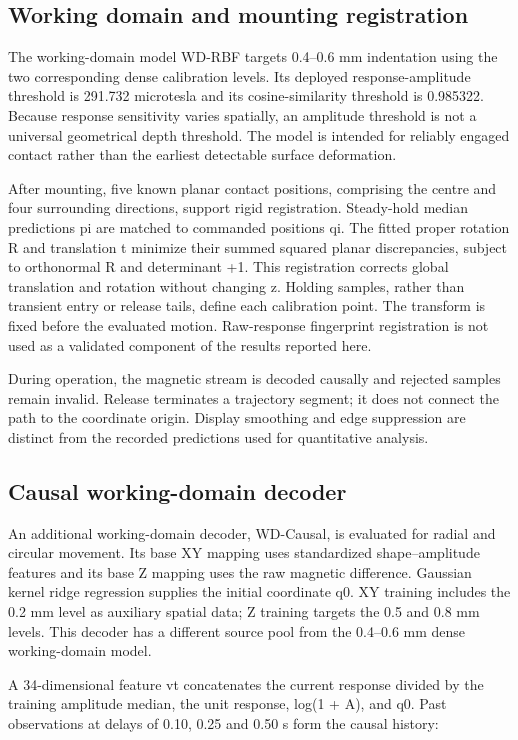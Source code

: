 \documentclass[preprint,12pt]{elsarticle}
\begin{document}
\subsection{Working domain and mounting registration}

The working-domain model WD-RBF targets 0.4--0.6 mm indentation using the two corresponding dense calibration levels. Its deployed response-amplitude threshold is 291.732 microtesla and its cosine-similarity threshold is 0.985322. Because response sensitivity varies spatially, an amplitude threshold is not a universal geometrical depth threshold. The model is intended for reliably engaged contact rather than the earliest detectable surface deformation.

After mounting, five known planar contact positions, comprising the centre and four surrounding directions, support rigid registration. Steady-hold median predictions pi are matched to commanded positions qi. The fitted proper rotation R and translation t minimize their summed squared planar discrepancies, subject to orthonormal R and determinant +1. This registration corrects global translation and rotation without changing z. Holding samples, rather than transient entry or release tails, define each calibration point. The transform is fixed before the evaluated motion. Raw-response fingerprint registration is not used as a validated component of the results reported here.

During operation, the magnetic stream is decoded causally and rejected samples remain invalid. Release terminates a trajectory segment; it does not connect the path to the coordinate origin. Display smoothing and edge suppression are distinct from the recorded predictions used for quantitative analysis.

\subsection{Causal working-domain decoder}

An additional working-domain decoder, WD-Causal, is evaluated for radial and circular movement. Its base XY mapping uses standardized shape--amplitude features and its base Z mapping uses the raw magnetic difference. Gaussian kernel ridge regression supplies the initial coordinate q0. XY training includes the 0.2 mm level as auxiliary spatial data; Z training targets the 0.5 and 0.8 mm levels. This decoder has a different source pool from the 0.4--0.6 mm dense working-domain model.

A 34-dimensional feature vt concatenates the current response divided by the training amplitude median, the unit response, log(1 + A), and q0. Past observations at delays of 0.10, 0.25 and 0.50 s form the causal history:
\end{document}
